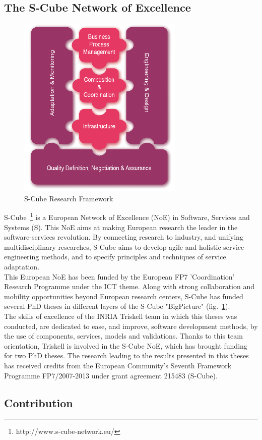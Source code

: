 \subsection{The S-Cube Network of Excellence}

\begin{figure}
	\vspace{-0.5cm}
  \centering
  \includegraphics[width=.3\textwidth]{part1/pics/scube-overview.png}
  \caption{S-Cube Research Framework}
  \label{fig:scube-overview2}
\end{figure}
S-Cube~\footnote{http://www.s-cube-network.eu/} is a European Network of Excellence (NoE) in Software, Services and Systems (S). This NoE aims at making European research the leader in the software-services revolution. By connecting research to industry, and unifying multidisciplinary researches, S-Cube aims to develop agile and holistic service engineering methods, and to specify principles and techniques of service adaptation.\\
This European NoE has been funded by the European FP7 'Coordination' Research Programme  under the ICT theme. Along with strong collaboration and mobility opportunities beyond European research centers, S-Cube has funded several PhD theses in different layers of the S-Cube "BigPicture" (fig.~\ref{fig:scube-overview2}).\\

The skills of excellence of the INRIA Triskell team in which this theses was conducted, are dedicated to ease, and improve, software development methods, by the use of components, services, models and validations. Thanks to this team orientation, Triskell is involved in the S-Cube NoE, which has brought funding for two PhD theses. The research leading to the results presented in this theses has received credits from the European Community’s Seventh Framework Programme FP7/2007-2013 under grant agreement 215483 (S-Cube).\\

\subsection{Contribution}

